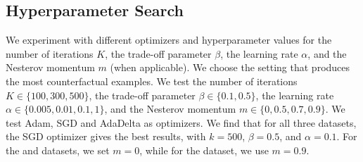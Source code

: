 \subsection{Hyperparameter Search}
\label{section:hyperparams}
We experiment with different optimizers and hyperparameter values for the number of iterations $K$, the trade-off parameter $\beta$, the learning rate $\alpha$, and the Nesterov momentum $m$ (when applicable). 
We choose the setting that produces the most counterfactual examples. 
We test the number of iterations $K \in \{100, 300, 500\}$, the trade-off parameter $\beta \in \{0.1, 0.5\}$, the learning rate $\alpha \in \{0.005, 0.01, 0.1, 1\}$, and the Nesterov momentum $m \in \{0, 0.5, 0.7, 0.9\}$. 
We test Adam, SGD and AdaDelta as optimizers. 
We find that for all three datasets, the SGD optimizer gives the best results, with $k = 500$, $\beta = 0.5$, and $\alpha = 0.1$. 
For the \synfour{} and \synfive{} datasets, we set $m = 0$, while for the \synone{} dataset, we use $m = 0.9$. 



